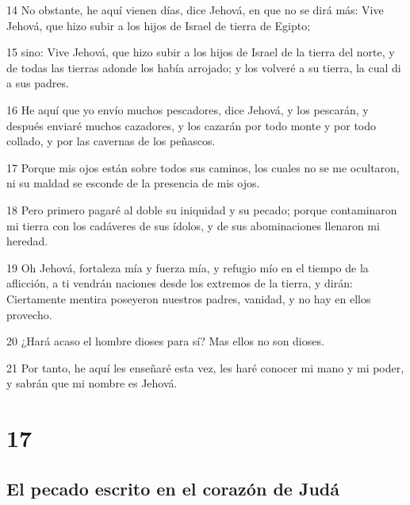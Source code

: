 \par 14 No obstante, he aquí vienen días, dice Jehová, en que no se dirá más: Vive Jehová, que hizo subir a los hijos de Israel de tierra de Egipto; 
\par 15 sino: Vive Jehová, que hizo subir a los hijos de Israel de la tierra del norte, y de todas las tierras adonde los había arrojado; y los volveré a su tierra, la cual di a sus padres.
\par 16 He aquí que yo envío muchos pescadores, dice Jehová, y los pescarán, y después enviaré muchos cazadores, y los cazarán por todo monte y por todo collado, y por las cavernas de los peñascos.
\par 17 Porque mis ojos están sobre todos sus caminos, los cuales no se me ocultaron, ni su maldad se esconde de la presencia de mis ojos.
\par 18 Pero primero pagaré al doble su iniquidad y su pecado; porque contaminaron mi tierra con los cadáveres de sus ídolos, y de sus abominaciones llenaron mi heredad.
\par 19 Oh Jehová, fortaleza mía y fuerza mía, y refugio mío en el tiempo de la aflicción, a ti vendrán naciones desde los extremos de la tierra, y dirán: Ciertamente mentira poseyeron nuestros padres, vanidad, y no hay en ellos provecho.
\par 20 ¿Hará acaso el hombre dioses para sí? Mas ellos no son dioses.
\par 21 Por tanto, he aquí les enseñaré esta vez, les haré conocer mi mano y mi poder, y sabrán que mi nombre es Jehová.

\chapter{17}

\section*{El pecado escrito en el corazón de Judá}

